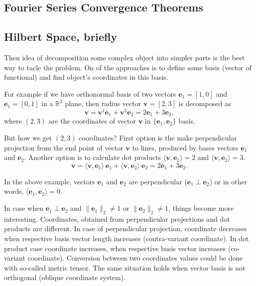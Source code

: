 \subsection{Fourier Series Convergence Theorems}\label{subsec:fourier-series-convergence}

\subsection{Hilbert Space, briefly}\label{subsec:hilbert-space-briefly}

        Then idea of decomposition some complex object into simpler parts is the best way to tacle the problem.
    On of the approaches is to define some basis (vector of functional) and find object's coordinates in this basis.

    For example if we have orthonormal basis of two vectors $\mathbf{e}_1 = [1, 0]$ and $\mathbf{e}_1 = [0, 1]$
    in a $\mathbb R^2$ plane, then radius vector $\mathbf{v} = [2, 3]$ is decomposed as
    \begin{equation}\label{eq:equation8}
        \mathbf{v} = \mathbf{v}^1 \mathbf{e}_1 + \mathbf{v}^2 \mathbf{e}_2 = 2 \mathbf{e}_1 + 3 \mathbf{e}_2,
    \end{equation}
    where $(2, 3)$ are the coordinates of vector $\mathbf{v}$ in $\{ \mathbf{e}_1, \mathbf{e}_2 \}$ basis.

    But how we get $(2, 3)$ coordinates?
    First option is the make perpendicular projection from the end point of vector $\mathbf{v}$ to lines, produced by bases vectors
    $\mathbf{e}_1$ and $\mathbf{e}_2$.
    Another option is to calculate dot products $\langle \mathbf{v}, \mathbf{e}_1 \rangle = 2$ and
    $\langle \mathbf{v}, \mathbf{e}_2 \rangle = 3$.
    \begin{equation}\label{eq:equation9}
        \mathbf{v} = \langle \mathbf{v}, \mathbf{e}_1 \rangle \  \mathbf{e}_1 +
                     \langle \mathbf{v}, \mathbf{e}_2 \rangle \  \mathbf{e}_2 =
                     2 \mathbf{e}_1 + 3 \mathbf{e}_2.
    \end{equation}

    In the above example, vectors $\mathbf{e}_1$ and $\mathbf{e}_2$ are perpendicular ($\mathbf{e}_1 \perp \mathbf{e}_2$)
    or in other words, $\langle \mathbf{e}_1, \mathbf{e}_2 \rangle = 0$.

    In case when $\mathbf{e}_1 \perp \mathbf{e}_2$ and $\| \mathbf{e}_1 \|_2 \ne 1$ or $\| \mathbf{e}_2 \|_2 \ne 1$,
    things become more interesting.
    Coordinates, obtained from perpendicular projections and dot products are different.
    In case of perpendicular projection, coordinate decreases when respective basis vector length increases (contra-variant coordinate).
    In dot product case coordinate increases, when respective basis vector increases (co-variant coordinate).
    Conversion between two coordinates values could be done with so-called metric tensor.
    The same situation holds when vector basis is not orthogonal (oblique coordinate system).

